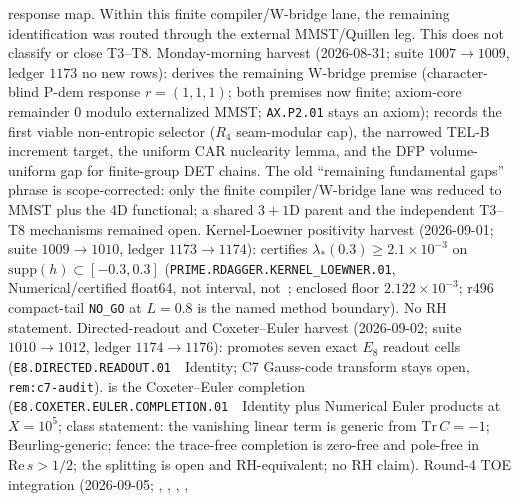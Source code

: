 \documentclass[11pt,a4paper]{article}
\begin{document}
response map.  Within this finite compiler/W-bridge lane, the remaining identification
was routed through the external MMST/Quillen leg.  This does not classify or close T3--T8.
Monday-morning harvest (2026-08-31; suite $1007\to1009$, ledger $1173$ no new rows):
derives the remaining W-bridge premise (character-blind P-dem response $r=(1,1,1)$;
both premises now finite; axiom-core remainder $0$ modulo externalized MMST;
\texttt{AX.P2.01} stays an axiom);
records the first viable non-entropic selector ($R_4$ seam-modular cap), the narrowed
TEL-B increment target, the uniform CAR nuclearity lemma, and the DFP volume-uniform gap
for finite-group DET chains.  The old ``remaining fundamental gaps'' phrase is
scope-corrected: only the finite compiler/W-bridge lane was reduced to MMST plus the
$4$D functional; a shared $3{+}1$D parent and the independent T3--T8 mechanisms remained open.
Kernel-Loewner positivity harvest (2026-09-01; suite $1009\to1010$, ledger $1173\to1174$):
certifies $\lambda_*(0.3)\ge 2.1{\times}10^{-3}$ on $\mathrm{supp}(h)\subset[-0.3,0.3]$
(\texttt{PRIME.RDAGGER.KERNEL\_LOEWNER.01}, Numerical/certified float64, not interval, not~\mE; enclosed floor $2.122{\times}10^{-3}$;
r496 compact-tail \texttt{NO\_GO} at $L=0.8$ is the named method boundary).  No RH statement.
Directed-readout and Coxeter--Euler harvest (2026-09-02; suite $1010\to1012$, ledger $1174\to1176$):
promotes seven exact $E_8$ readout cells (\texttt{E8.DIRECTED.READOUT.01}~\mE\ Identity;
C7 Gauss-code transform stays open, \texttt{rem:c7-audit}).
is the Coxeter--Euler completion (\texttt{E8.COXETER.EULER.COMPLETION.01}~\mE\ Identity plus Numerical Euler products at $X=10^5$;
class statement: the vanishing linear term is generic from $\mathrm{Tr}\,C=-1$; Beurling-generic;
fence: the trace-free completion is zero-free and pole-free in $\mathrm{Re}\,s>1/2$; the splitting is open and RH-equivalent; no RH claim).
Round-4 TOE integration (2026-09-05;
,
,
,
,
\end{document}
